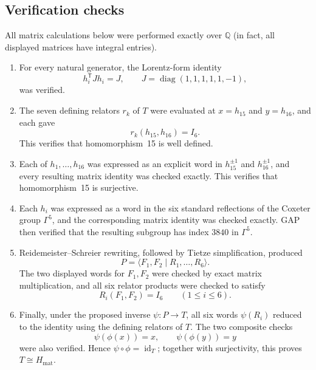 \subsection{Verification checks}

All matrix calculations below were performed exactly over $\mathbb Q$ (in
fact, all displayed matrices have integral entries).
\begin{enumerate}
\item For every natural generator, the Lorentz-form identity
\[
h_i^\mathsf{T}Jh_i=J,
\qquad
J=\operatorname{diag}(1,1,1,1,1,-1),
\]
was verified.

\item The seven defining relators $r_k$ of $T$ were evaluated at
$x=h_{15}$ and $y=h_{16}$, and each gave
\[
r_k(h_{15},h_{16})=I_6.
\]
This verifies that homomorphism~15 is well defined.

\item Each of $h_1,\ldots,h_{16}$ was expressed as an explicit word in
$h_{15}^{\pm1}$ and $h_{16}^{\pm1}$, and every resulting matrix
identity was checked exactly.  This verifies that homomorphism~15 is
surjective.

\item Each $h_i$ was expressed as a word in the six standard reflections of
the Coxeter group $\Gamma^5$, and the corresponding matrix identity was
checked exactly.  GAP then verified that the resulting subgroup has index
$3840$ in $\Gamma^5$.

\item Reidemeister--Schreier rewriting, followed by Tietze simplification,
produced
\[
P=\langle F_1,F_2\mid R_1,\ldots,R_6\rangle.
\]
The two displayed words for $F_1,F_2$ were checked by exact matrix
multiplication, and all six relator products were checked to satisfy
\[
R_i(F_1,F_2)=I_6\qquad(1\leq i\leq6).
\]

\item Finally, under the proposed inverse $\psi:P\to T$, all six words
$\psi(R_i)$ reduced to the identity using the defining relators of $T$.
The two composite checks
\[
\psi(\phi(x))=x,
\qquad
\psi(\phi(y))=y
\]
were also verified.  Hence $\psi\circ\phi=\operatorname{id}_T$; together
with surjectivity, this proves $T\cong H_{\mathrm{mat}}$.
\end{enumerate}
